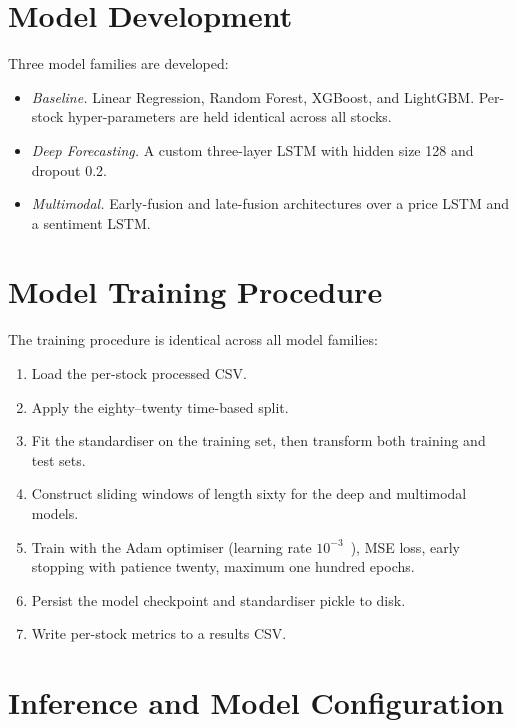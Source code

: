 \documentclass[12pt,a4paper,oneside]{report}
\begin{document}
\section{Model Development}

Three model families are developed:

\begin{itemize}[leftmargin=*,itemsep=2pt]
  \item \emph{Baseline.} Linear Regression, Random Forest, XGBoost,
        and LightGBM. Per-stock hyper-parameters are held identical
        across all stocks.
  \item \emph{Deep Forecasting.} A custom three-layer \ac{LSTM}
        with hidden size 128 and dropout 0.2.
  \item \emph{Multimodal.} Early-fusion and late-fusion
        architectures over a price \ac{LSTM} and a sentiment
        \ac{LSTM}.
\end{itemize}

\section{Model Training Procedure}

The training procedure is identical across all model families:

\begin{enumerate}[leftmargin=*,itemsep=2pt]
  \item Load the per-stock processed CSV.
  \item Apply the eighty--twenty time-based split.
  \item Fit the standardiser on the training set, then transform
        both training and test sets.
  \item Construct sliding windows of length sixty for the deep and
        multimodal models.
  \item Train with the Adam optimiser (learning rate
        $10^{-3}$~\cite{kingma2015adam}), \ac{MSE} loss, early stopping with patience
        twenty, maximum one hundred epochs.
  \item Persist the model checkpoint and standardiser pickle to
        disk.
  \item Write per-stock metrics to a results CSV.
\end{enumerate}

\section{Inference and Model Configuration}
\end{document}

